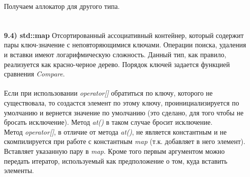 \documentclass{article}
\begin{document}
Получаем аллокатор для другого типа.\\\\
\noindent \\ \textbf{9.4) std::map}
Отсортированный ассоциативный контейнер, который содержит пары ключ-значение с неповторяющимися ключами. Операции поиска, удаления и вставки имеют логарифмическую сложность. Данный тип, как правило, реализуется как красно-черное дерево.
Порядок ключей задается функцией сравнения \textit{Compare}.\\\\ 
Если при использовании \textit{operator[]} обратиться по ключу, которого не существовала, то создастся элемент по этому ключу, проинициализируется по умолчанию и вернется значение по умолчанию (это сделано, для того чтобы не бросать исключение).
Метод \textit{at()} в таком случае бросит исключение.\\
Метод \textit{operator[]}, в отличие от метода \textit{at()}, не является константным и не скомпилируется при работе с константным \textit{map} (т.к. добавляет в него элемент).
Вставляет указанную пару в \textit{map}. Кроме того первым аргументом можно передать итератор, используемый как предположение о том, куда вставить элементы.
\end{document}
